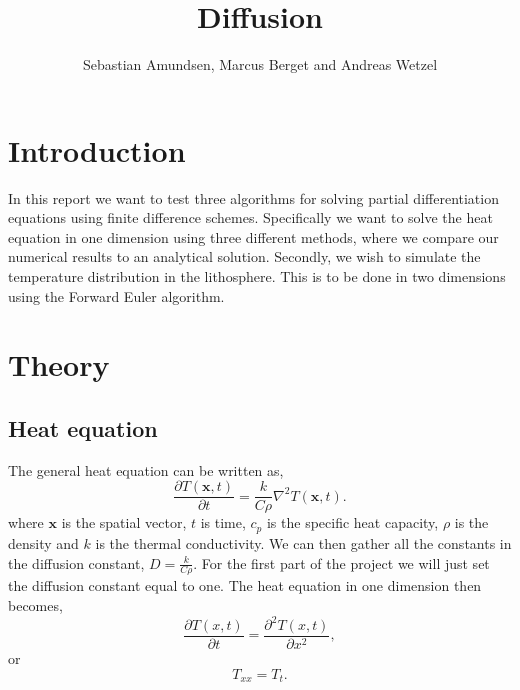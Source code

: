 \documentclass{article}
\begin{document}
\title{Diffusion}
\author{Sebastian Amundsen, Marcus Berget and Andreas Wetzel}

\maketitle

\begin{abstract}

\end{abstract}

\begin{multicols}{2}

\section{Introduction}

In this report we want to test three algorithms for solving partial differentiation equations using finite difference schemes. Specifically we want to solve the heat equation in one dimension using three different methods, where we compare our numerical results to an analytical solution. Secondly, we wish to simulate the temperature distribution in the lithosphere. This is to be done in two dimensions using the Forward Euler algorithm. 

\section{Theory}

\subsection{Heat equation}

The general heat equation can be written as,
\begin{equation}
	\frac{\partial T(\textbf{x}, t)}{\partial t} = \frac{k}{C\rho}\nabla^2 T(\textbf{x}, t). \label{eq:gen_heat}
\end{equation}
where $\textbf{x}$ is the spatial vector, $t$ is time, $c_p$ is the specific heat capacity, $\rho$ is the density and $k$ is the thermal conductivity. We can then gather all the constants in the diffusion constant, $D=\frac{k}{C\rho}$. For the first part of the project we will just set the diffusion constant equal to one. The heat equation in one dimension then becomes, 
\begin{equation}
	\frac{\partial T(x,t)}{\partial t} = \frac{\partial^2 T(x,t)}{\partial x^2}, \label{eq:heat_one}
\end{equation}
or 
\begin{equation}
	T_{xx}=T_t.
\end{equation}

\end{multicols}
\end{document}
